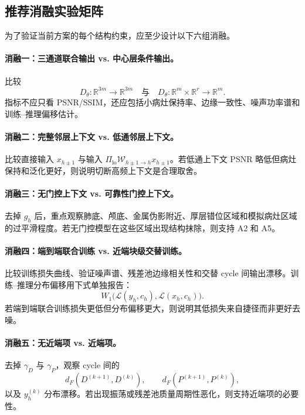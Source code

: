 \documentclass[11pt,a4paper,UTF8,fontset=fandol]{ctexart}
\theoremstyle{definition}
\newcommand{\R}{\mathbb{R}}
\begin{document}
\subsection{推荐消融实验矩阵}

为了验证当前方案的每个结构约束，应至少设计以下六组消融。

\paragraph{消融一：三通道联合输出 vs. 中心层条件输出。}
比较
\begin{equation}
    D_\theta:\R^{3m}\to\R^{3m}
    \quad \text{与} \quad
    D_\theta:\R^m\times\R^r\to\R^m.
\end{equation}
指标不应只看 PSNR/SSIM，还应包括小病灶保持率、边缘一致性、噪声功率谱和训练--推理偏移估计。

\paragraph{消融二：完整邻层上下文 vs. 低通邻层上下文。}
比较直接输入 $x_{h\pm1}$ 与输入 $\Pi_{\mathrm{lo}}\mathcal W_{h\pm1\to h}x_{h\pm1}$。若低通上下文 PSNR 略低但病灶保持和泛化更好，则说明切断高频上下文是合理取舍。

\paragraph{消融三：无门控上下文 vs. 可靠性门控上下文。}
去掉 $g_h$ 后，重点观察肺底、颅底、金属伪影附近、厚层错位区域和模拟病灶区域的过平滑程度。若无门控模型在这些区域出现结构抹除，则支持 A2 和 A5。

\paragraph{消融四：端到端联合训练 vs. 近端块级交替训练。}
比较训练损失曲线、验证噪声谱、残差池边缘相关性和交替 cycle 间输出漂移。训练--推理分布偏移用下式单独报告：
\begin{equation}
    W_1\big(\mathcal L(y_h,c_h),\mathcal L(x_h,c_h)\big).
\end{equation}
若端到端联合训练损失更低但分布偏移更大，则说明其低损失来自捷径而非更好去噪。

\paragraph{消融五：无近端项 vs. 近端项。}
去掉 $\gamma_D$ 与 $\gamma_P$，观察 cycle 间的
\begin{equation}
    d_F(D^{(k+1)},D^{(k)}),
    \qquad
    d_F(P^{(k+1)},P^{(k)}),
\end{equation}
以及 $y_h^{(k)}$ 分布漂移。若出现振荡或残差池质量周期性恶化，则支持近端项的必要性。
\end{document}

